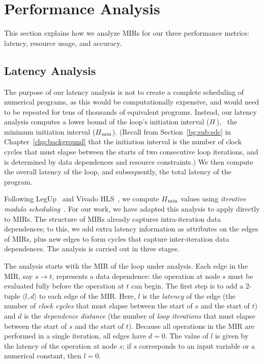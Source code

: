 \section{Performance Analysis}
\label{lo:sec:performance_analysis}

This section explains how we analyze MIRs for our three performance metrics:
latency, resource usage, and accuracy. %

\subsection{Latency Analysis}
\label{lo:sub:latency_analysis}

The purpose of our latency analysis is not to create a complete scheduling
of numerical programs, as this would be computationally expensive, and
would need to be repeated for tens of thousands of equivalent programs.
Instead, our latency analysis computes a lower bound of the loop's initiation
interval ($\mathit{II}$), \ie~the minimum initiation interval ($\mathit{II}_{\rm min}$).  (Recall from
Section~\ref{bg:sub:sdc} in Chapter~\ref{chp:background} that the initiation
interval is the number of clock cycles that must elapse between the starts of
two consecutive loop iterations, and is determined by data dependences and
resource constraints.)  We then compute the overall latency of the loop, and
subsequently, the total latency of the program.

Following LegUp~\cite{legup} and Vivado HLS~\cite{vivado_hls}, we compute
$\mathit{II}_{\rm min}$ values using \emph{iterative modulo scheduling}~\cite{rau94}. For our
work, we have adapted this analysis to apply directly to MIRs. The structure of
MIRs already captures intra-iteration data dependences; to this, we add extra
latency information as attributes on the edges of MIRs, plus new edges to form
cycles that capture inter-iteration data dependences.  The analysis is carried
out in three stages.

The analysis starts with the MIR of the loop under analysis. Each edge in the
MIR, say $s\rightarrow t$, represents a data dependence: the operation at
node $s$ must be evaluated fully before the operation at $t$ can begin. The
first step is to add a 2-tuple $\langle l, d \rangle$ to each edge of the
MIR\@. Here, $l$ is the \emph{latency} of the edge (the number of \emph{clock
cycles} that must elapse between the start of $s$ and the start of $t$) and
$d$ is the \emph{dependence distance} (the number of \emph{loop iterations}
that must elapse between the start of $s$ and the start of $t$). Because all
operations in the MIR are performed in a single iteration, all edges have
$d=0$. The value of $l$ is given by the latency of the operation at node $s$;
if $s$ corresponds to an input variable or a numerical constant, then $l=0$.

